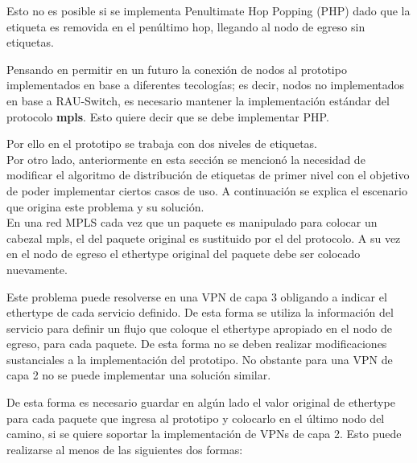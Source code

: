 Esto no es posible si se implementa Penultimate Hop Popping (PHP) dado que la etiqueta es removida en el pen\'ultimo hop, llegando al nodo de egreso sin etiquetas.

Pensando en permitir en un futuro la conexi\'on de nodos al prototipo implementados en base a diferentes tecolog\'ias; es decir, nodos no implementados en base a RAU-Switch, es necesario mantener la implementaci\'on estándar del protocolo \textbf{mpls}. Esto quiere decir que se debe implementar PHP.

Por ello en el prototipo se trabaja con dos niveles de etiquetas.\\

Por otro lado, anteriormente en esta secci\'on se mencion\'o la necesidad de modificar el algoritmo de distribución de etiquetas de primer nivel con el objetivo de poder implementar ciertos casos de uso. A continuaci\'on se explica el escenario que origina este problema y su soluci\'on.\\

En una red MPLS cada vez que un paquete es manipulado para colocar un cabezal mpls, el  del paquete original es sustituido por el del protocolo. A su vez en el nodo de egreso el ethertype original del paquete debe ser colocado nuevamente. 

Este problema puede resolverse en una VPN de capa 3 obligando a indicar el ethertype de cada servicio definido. De esta forma se utiliza la informaci\'on del servicio para definir un flujo que coloque el ethertype apropiado en el nodo de egreso, para cada paquete. De esta forma no se deben realizar modificaciones sustanciales a la implementaci\'on del prototipo. No obstante para una VPN de capa 2 no se puede implementar una soluci\'on similar.

De esta forma es necesario guardar en alg\'un lado el valor original de ethertype para cada paquete que ingresa al prototipo y colocarlo en el \'ultimo nodo del camino, si se quiere soportar la implementaci\'on de VPNs de capa 2. Esto puede realizarse al menos de las siguientes dos formas:

